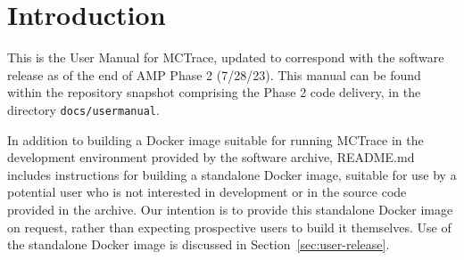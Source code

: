 \section{Introduction}
\label{sec:introduction}

This is the User Manual for MCTrace, updated to correspond with the
software release as of the end of AMP Phase 2 (7/28/23).  This manual
can be found within the repository snapshot comprising the Phase 2 code delivery,
in the directory \texttt{docs/usermanual}.  

In addition to building a Docker image suitable for running MCTrace in
the development environment provided by the software archive, README.md
includes instructions for building a standalone Docker image, suitable
for use by a potential user who is not interested in development or in
the source code provided in the archive. Our intention is to provide
this standalone Docker image on request, rather than expecting
prospective users to build it themselves. Use of the standalone Docker
image is discussed in Section~\ref{sec:user-release}.


  